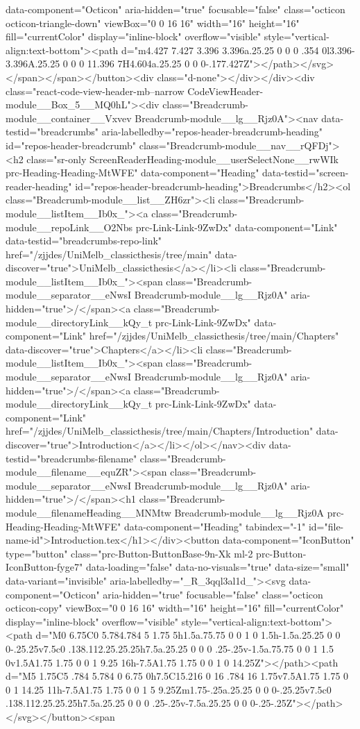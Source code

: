 {{{{{data-component="Octicon" aria-hidden="true" focusable="false" class="octicon octicon-triangle-down" viewBox="0 0 16 16" width="16" height="16" fill="currentColor" display="inline-block" overflow="visible" style="vertical-align:text-bottom"><path d="m4.427 7.427 3.396 3.396a.25.25 0 0 0 .354 0l3.396-3.396A.25.25 0 0 0 11.396 7H4.604a.25.25 0 0 0-.177.427Z"></path></svg></span></span></button><div class="d-none"></div></div><div class="react-code-view-header-mb--narrow CodeViewHeader-module__Box_5__MQ0hL"><div class="Breadcrumb-module__container__Vxvev Breadcrumb-module__lg__Rjz0A"><nav data-testid="breadcrumbs" aria-labelledby="repos-header-breadcrumb-heading" id="repos-header-breadcrumb" class="Breadcrumb-module__nav__rQFDj"><h2 class="sr-only ScreenReaderHeading-module__userSelectNone__rwWIk prc-Heading-Heading-MtWFE" data-component="Heading" data-testid="screen-reader-heading" id="repos-header-breadcrumb-heading">Breadcrumbs</h2><ol class="Breadcrumb-module__list__ZH6zr"><li class="Breadcrumb-module__listItem__Ib0x_"><a class="Breadcrumb-module__repoLink__O2Nbs prc-Link-Link-9ZwDx" data-component="Link" data-testid="breadcrumbs-repo-link" href="/zjjdes/UniMelb_classicthesis/tree/main" data-discover="true">UniMelb_classicthesis</a></li><li class="Breadcrumb-module__listItem__Ib0x_"><span class="Breadcrumb-module__separator__eNwsI Breadcrumb-module__lg__Rjz0A" aria-hidden="true">/</span><a class="Breadcrumb-module__directoryLink__kQy_t prc-Link-Link-9ZwDx" data-component="Link" href="/zjjdes/UniMelb_classicthesis/tree/main/Chapters" data-discover="true">Chapters</a></li><li class="Breadcrumb-module__listItem__Ib0x_"><span class="Breadcrumb-module__separator__eNwsI Breadcrumb-module__lg__Rjz0A" aria-hidden="true">/</span><a class="Breadcrumb-module__directoryLink__kQy_t prc-Link-Link-9ZwDx" data-component="Link" href="/zjjdes/UniMelb_classicthesis/tree/main/Chapters/Introduction" data-discover="true">Introduction</a></li></ol></nav><div data-testid="breadcrumbs-filename" class="Breadcrumb-module__filename__equZR"><span class="Breadcrumb-module__separator__eNwsI Breadcrumb-module__lg__Rjz0A" aria-hidden="true">/</span><h1 class="Breadcrumb-module__filenameHeading__MNMtw Breadcrumb-module__lg__Rjz0A prc-Heading-Heading-MtWFE" data-component="Heading" tabindex="-1" id="file-name-id">Introduction.tex</h1></div><button data-component="IconButton" type="button" class="prc-Button-ButtonBase-9n-Xk ml-2 prc-Button-IconButton-fyge7" data-loading="false" data-no-visuals="true" data-size="small" data-variant="invisible" aria-labelledby="_R_3qql3al1d_"><svg data-component="Octicon" aria-hidden="true" focusable="false" class="octicon octicon-copy" viewBox="0 0 16 16" width="16" height="16" fill="currentColor" display="inline-block" overflow="visible" style="vertical-align:text-bottom"><path d="M0 6.75C0 5.784.784 5 1.75 5h1.5a.75.75 0 0 1 0 1.5h-1.5a.25.25 0 0 0-.25.25v7.5c0 .138.112.25.25.25h7.5a.25.25 0 0 0 .25-.25v-1.5a.75.75 0 0 1 1.5 0v1.5A1.75 1.75 0 0 1 9.25 16h-7.5A1.75 1.75 0 0 1 0 14.25Z"></path><path d="M5 1.75C5 .784 5.784 0 6.75 0h7.5C15.216 0 16 .784 16 1.75v7.5A1.75 1.75 0 0 1 14.25 11h-7.5A1.75 1.75 0 0 1 5 9.25Zm1.75-.25a.25.25 0 0 0-.25.25v7.5c0 .138.112.25.25.25h7.5a.25.25 0 0 0 .25-.25v-7.5a.25.25 0 0 0-.25-.25Z"></path></svg></button><span }}}}}
